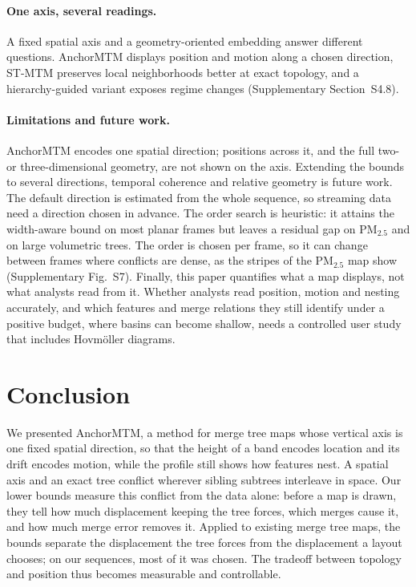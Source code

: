 \paragraph{One axis, several readings.} A fixed spatial axis and a geometry-oriented embedding answer different questions. AnchorMTM displays position and motion along a chosen direction, ST-MTM preserves local neighborhoods better at exact topology, and a hierarchy-guided variant exposes regime changes (Supplementary Section~S4.8).

\paragraph{Limitations and future work.} AnchorMTM encodes one spatial direction; positions across it, and the full two- or three-dimensional geometry, are not shown on the axis. Extending the bounds to several directions, temporal coherence and relative geometry is future work. The default direction is estimated from the whole sequence, so streaming data need a direction chosen in advance. The order search is heuristic: it attains the width-aware bound on most planar frames but leaves a residual gap on PM$_{2.5}$ and on large volumetric trees. The order is chosen per frame, so it can change between frames where conflicts are dense, as the stripes of the PM$_{2.5}$ map show (Supplementary Fig.~S7). Finally, this paper quantifies what a map displays, not what analysts read from it. Whether analysts read position, motion and nesting accurately, and which features and merge relations they still identify under a positive budget, where basins can become shallow, needs a controlled user study that includes Hovm\"oller diagrams.

\section{Conclusion}\label{sec:conclusion}
We presented AnchorMTM, a method for merge tree maps whose vertical axis is one fixed spatial direction, so that the height of a band encodes location and its drift encodes motion, while the profile still shows how features nest. A spatial axis and an exact tree conflict wherever sibling subtrees interleave in space. Our lower bounds measure this conflict from the data alone: before a map is drawn, they tell how much displacement keeping the tree forces, which merges cause it, and how much merge error removes it. Applied to existing merge tree maps, the bounds separate the displacement the tree forces from the displacement a layout chooses; on our sequences, most of it was chosen. The tradeoff between topology and position thus becomes measurable and controllable.
